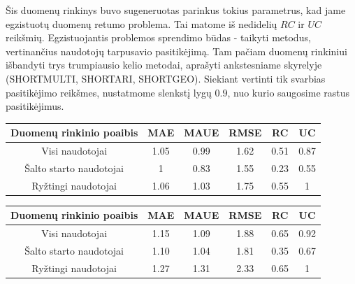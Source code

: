 \documentclass{VUMIFInfMagistrinis}
\begin{document}
\indent
Šis duomenų rinkinys buvo sugeneruotas parinkus tokius parametrus, kad jame egzistuotų duomenų retumo problema. Tai matome iš nedidelių $RC$ ir $UC$ reikšmių. Egzistuojantis problemos sprendimo būdas - taikyti metodus, vertinančius naudotojų tarpusavio pasitikėjimą. Tam pačiam duomenų rinkiniui išbandyti trys trumpiausio kelio metodai, aprašyti ankstesniame skyrelyje (SHORTMULTI, SHORTARI, SHORTGEO). Siekiant vertinti tik svarbias pasitikėjimo reikšmes, nustatmome slenkstį lygų $0.9$, nuo kurio saugosime rastus pasitikėjimus.
\begin{center}
	\begin{tabular}{||c c c c c c||} 
		Duomenų rinkinio poaibis & MAE & MAUE & RMSE & RC & UC \\
		\hline
		Visi naudotojai & 1.05 & 0.99 & 1.62 & 0.51 & 0.87 \\
		\hline
		Šalto starto naudotojai & 1 & 0.83 & 1.55 & 0.23 & 0.55 \\
		\hline
		Ryžtingi naudotojai & 1.06 & 1.03 & 1.75 & 0.55 & 1 \\
	\end{tabular}
\end{center}

\begin{center}
	\begin{tabular}{||c c c c c c||} 
		Duomenų rinkinio poaibis & MAE & MAUE & RMSE & RC & UC \\
		\hline
		Visi naudotojai & 1.15 & 1.09 & 1.88 & 0.65 & 0.92 \\
		\hline
		Šalto starto naudotojai & 1.10 & 1.04 & 1.81 & 0.35 & 0.67 \\
		\hline
		Ryžtingi naudotojai & 1.27 & 1.31 & 2.33 & 0.65 & 1 \\
	\end{tabular}
	
\end{center}
\end{document}
